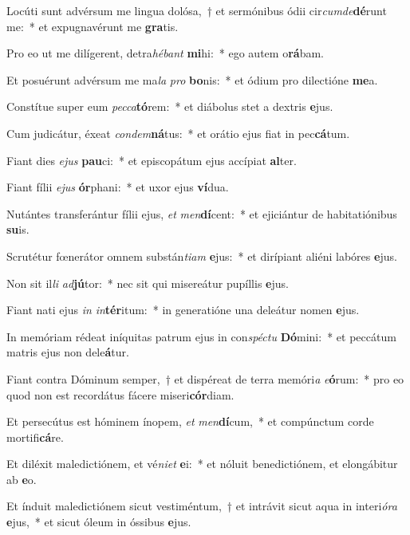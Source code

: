 \item Locúti sunt advérsum me lingua dolósa,~† et sermónibus ódii cir\textit{cum}\textit{de}\textbf{dé}runt me:~* et expugnavérunt me \textbf{gra}tis.
\item Pro eo ut me dilígerent, detra\textit{hé}\textit{bant} \textbf{mi}hi:~* ego autem o\textbf{rá}bam.
\item Et posuérunt advérsum me ma\textit{la} \textit{pro} \textbf{bo}nis:~* et ódium pro dilectióne \textbf{me}a.
\item Constítue super eum \textit{pec}\textit{ca}\textbf{tó}rem:~* et diábolus stet a dextris \textbf{e}jus.
\item Cum judicátur, éxeat \textit{con}\textit{dem}\textbf{ná}tus:~* et orátio ejus fiat in pec\textbf{cá}tum.
\item Fiant dies \textit{e}\textit{jus} \textbf{pau}ci:~* et episcopátum ejus accípiat \textbf{al}ter.
\item Fiant fílii \textit{e}\textit{jus} \textbf{ór}phani:~* et uxor ejus \textbf{ví}dua.
\item Nutántes transferántur fílii ejus, \textit{et} \textit{men}\textbf{dí}cent:~* et ejiciántur de habitatiónibus \textbf{su}is.
\item Scrutétur fœnerátor omnem substán\textit{ti}\textit{am} \textbf{e}jus:~* et dirípiant aliéni labóres \textbf{e}jus.
\item Non sit il\textit{li} \textit{ad}\textbf{jú}tor:~* nec sit qui misereátur pupíllis \textbf{e}jus.
\item Fiant nati ejus \textit{in} \textit{in}\textbf{tér}itum:~* in generatióne una deleátur nomen \textbf{e}jus.
\item In memóriam rédeat iníquitas patrum ejus in con\textit{spéc}\textit{tu} \textbf{Dó}mini:~* et peccátum matris ejus non dele\textbf{á}tur.
\item Fiant contra Dóminum semper,~† et dispéreat de terra memóri\textit{a} \textit{e}\textbf{ó}rum:~* pro eo quod non est recordátus fácere miseri\textbf{cór}diam.
\item Et persecútus est hóminem ínopem, \textit{et} \textit{men}\textbf{dí}cum,~* et compúnctum corde mortifi\textbf{cá}re.
\item Et diléxit maledictiónem, et vé\textit{ni}\textit{et} \textbf{e}i:~* et nóluit benedictiónem, et elongábitur ab \textbf{e}o.
\item Et índuit maledictiónem sicut vestiméntum,~† et intrávit sicut aqua in interi\textit{ó}\textit{ra} \textbf{e}jus,~* et sicut óleum in óssibus \textbf{e}jus.
